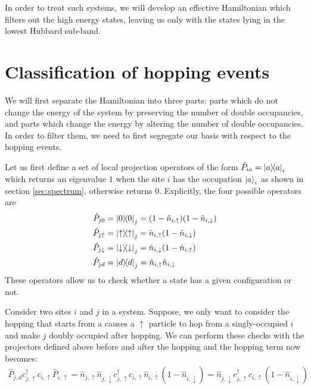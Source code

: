 \documentclass[]{report}
\begin{document}
In order to treat such systems, we will develop an effective Hamiltonian which filters out the high energy states, leaving us only with the states lying in the lowest Hubbard sub-band.

\section{Classification of hopping events}
We will first separate the Hamiltonian into three parts: parts which do not change the energy of the system by preserving the number of double occupancies, and parts which change the energy by altering the number of double occupancies. In order to filter them, we need to first segregate our basis with respect to the hopping events.

Let us first define a set of local projection operators of the form $ \hat{P}_{i a} = \op{a}_{i} $ which returns an eigenvalue $ 1 $ when the site $ i $ has the occupation $ \ket{a}_i $ as shown in section \ref{sec:spectrum}, otherwise returns 0. Explicitly, the four possible operators are
\begin{align}
	\hat{P}_{j 0} &= \op{0}_j = (1 - \hat{n}_{i, \uparrow})(1 - \hat{n}_{i, \downarrow})\\
	\hat{P}_{j \uparrow} &= \op{\uparrow}_j = \hat{n}_{i, \uparrow} (1 - \hat{n}_{i, \downarrow})\\
	\hat{P}_{j \downarrow} &= \op{\downarrow}_j = \hat{n}_{i, \downarrow} (1 - \hat{n}_{i, \uparrow})\\
	\hat{P}_{j d} &= \op{d}_j = \hat{n}_{i, \uparrow} \hat{n}_{i, \downarrow}
\end{align}
These operators allow us to check whether a state has a given configuration or not.

Consider two sites $ i $ and $ j $ in a system. Suppose, we only want to consider the hopping that starts from a  causes a $ \uparrow $ particle to hop from a singly-occupied $ i $ and make $ j $ doubly occupied after hopping. We can perform these checks with the projectors defined above before and after the hopping and the hopping term now becomes:
\begin{align}
	\hat{P}_{j, d} c^{\dagger}_{j, \uparrow} c_{i, \uparrow} \hat{P}_{i, \uparrow} = \hat{n}_{j, \uparrow}\hat{n}_{j, \downarrow} c^{\dagger}_{j, \uparrow} c_{i, \uparrow} \hat{n}_{i, \uparrow} (1 - \hat{n}_{i, \downarrow}) = \hat{n}_{j, \downarrow} c^{\dagger}_{j, \uparrow} c_{i, \uparrow} (1 - \hat{n}_{i, \downarrow})
\end{align}
\end{document}
